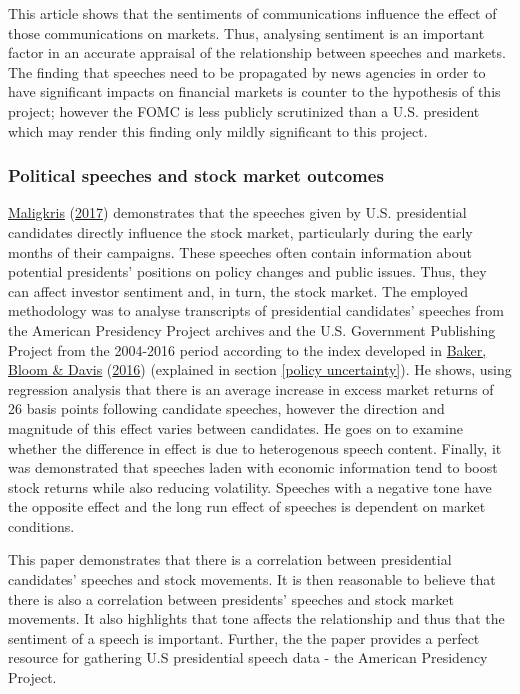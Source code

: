 \documentclass[11pt,preprint, authoryear]{elsarticle}
\numberwithin{equation}{section}
\numberwithin{figure}{section}
\numberwithin{table}{section}
\begin{document}
This article shows that the sentiments of communications influence the
effect of those communications on markets. Thus, analysing sentiment is
an important factor in an accurate appraisal of the relationship between
speeches and markets. The finding that speeches need to be propagated by
news agencies in order to have significant impacts on financial markets
is counter to the hypothesis of this project; however the FOMC is less
publicly scrutinized than a U.S. president which may render this finding
only mildly significant to this project.

\hypertarget{political-speeches-and-stock-market-outcomes}{%
\subsubsection{\texorpdfstring{Political speeches and stock market
outcomes
\label{Political speeches}}{Political speeches and stock market outcomes }}\label{political-speeches-and-stock-market-outcomes}}

\protect\hyperlink{ref-maligkris2017political}{Maligkris}
(\protect\hyperlink{ref-maligkris2017political}{2017}) demonstrates that
the speeches given by U.S. presidential candidates directly influence
the stock market, particularly during the early months of their
campaigns. These speeches often contain information about potential
presidents' positions on policy changes and public issues. Thus, they
can affect investor sentiment and, in turn, the stock market. The
employed methodology was to analyse transcripts of presidential
candidates' speeches from the American Presidency Project archives and
the U.S. Government Publishing Project from the 2004-2016 period
according to the index developed in
\protect\hyperlink{ref-baker2016measuring}{Baker, Bloom \& Davis}
(\protect\hyperlink{ref-baker2016measuring}{2016}) (explained in section
\ref{policy uncertainty}). He shows, using regression analysis that
there is an average increase in excess market returns of 26 basis points
following candidate speeches, however the direction and magnitude of
this effect varies between candidates. He goes on to examine whether the
difference in effect is due to heterogenous speech content. Finally, it
was demonstrated that speeches laden with economic information tend to
boost stock returns while also reducing volatility. Speeches with a
negative tone have the opposite effect and the long run effect of
speeches is dependent on market conditions.

This paper demonstrates that there is a correlation between presidential
candidates' speeches and stock movements. It is then reasonable to
believe that there is also a correlation between presidents' speeches
and stock market movements. It also highlights that tone affects the
relationship and thus that the sentiment of a speech is important.
Further, the the paper provides a perfect resource for gathering U.S
presidential speech data - the American Presidency Project.
\end{document}
